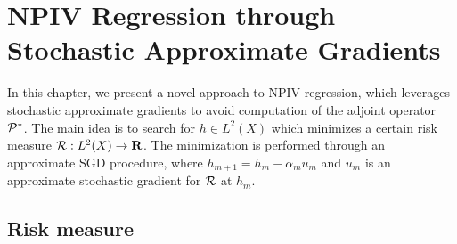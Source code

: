 \chapter{NPIV Regression through Stochastic Approximate Gradients}

In this chapter, we present a novel approach to NPIV regression, which leverages stochastic approximate gradients to avoid computation of the adjoint operator $ \mathcal{P}^{ * } $.
The main idea is to search for $ h \in L^2 ( X ) $ which minimizes a certain risk measure $ \mathcal{R} : L^2 ( X ) \to \mathbf{R} $.
The minimization is performed through an approximate SGD procedure, where $ h_{ m + 1 } = h_{ m } - \alpha_{ m } u_{ m } $ and $ u_{ m } $ is an approximate stochastic gradient for $ \mathcal{R} $ at $ h_{ m } $.

\section{Risk measure}

